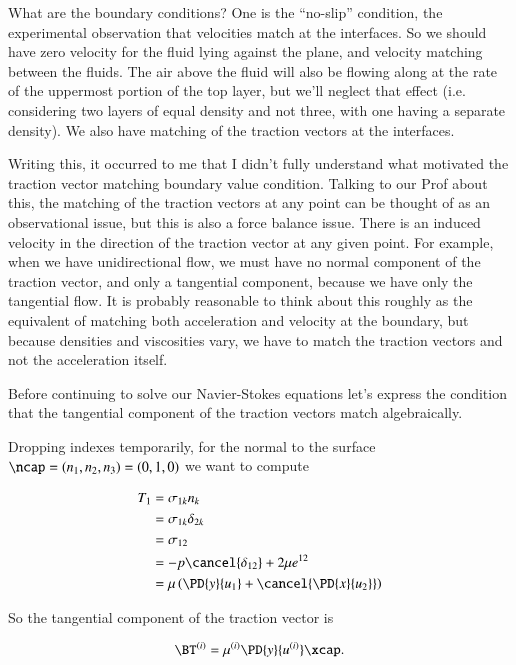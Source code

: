 What are the boundary conditions?  One is the ``no-slip'' condition, the experimental observation that velocities match at the interfaces.  So we should have zero velocity for the fluid lying against the plane, and velocity matching between the fluids.  The air above the fluid will also be flowing along at the rate of the uppermost portion of the top layer, but we'll neglect that effect (i.e. considering two layers of equal density and not three, with one having a separate density).  We also have matching of the traction vectors at the interfaces.  

Writing this, it occurred to me that I didn't fully understand what motivated the traction vector matching boundary value condition.  Talking to our Prof about this, the matching of the traction vectors at any point can be thought of as an observational issue, but this is also a force balance issue.  There is an induced velocity in the direction of the traction vector at any given point.  For example, when we have unidirectional flow, we must have no normal component of the traction vector, and only a tangential component, because we have only the tangential flow.  It is probably reasonable to think about this roughly as the equivalent of matching both acceleration and velocity at the boundary, but because densities and viscosities vary, we have to match the traction vectors and not the acceleration itself.

Before continuing to solve our Navier-Stokes equations let's express the condition that the tangential component of the traction vectors match algebraically.

Dropping indexes temporarily, for the normal to the surface $\ncap = (n_1, n_2, n_3) = (0, 1, 0)$ we want to compute

\begin{align*}
T_1 
&= \sigma_{1 k} n_k \\
&= \sigma_{1 k} \delta_{2 k} \\
&= \sigma_{1 2} \\
&= -p \cancel{\delta_{1 2}} + 2 \mu e^{1 2} \\
&= \mu \left( \PD{y}{u_1} + \cancel{\PD{x}{u_2}} \right) 
\end{align*}

So the tangential component of the traction vector is

\begin{equation}\label{eqn:twoLayerInclinedFlow:90}
\BT^{(i)} = \mu^{(i)} \PD{y}{u^{(i)}} \xcap.
\end{equation}

